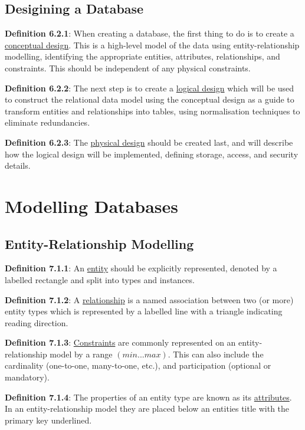 \documentclass{article}
\newcommand{\separate}[1] {\vspace{#1 pt}\noindent}
\newcommand{\definition}[2]{\textbf{Definition #1}: #2\label{def:#1}}
\begin{document}
\subsection{Desigining a Database}

\definition{6.2.1}{When creating a database, the first thing to do is to create a \underline{conceptual design}. This is a high-level model of the data using entity-relationship modelling, identifying the appropriate entities, attributes, relationships, and constraints. This should be independent of any physical constraints.}

\separate{5}\definition{6.2.2}{The next step is to create a \underline{logical design} which will be used to construct the relational data model using the conceptual design as a guide to transform entities and relationships into tables, using normalisation techniques to eliminate redundancies.}

\separate{5}\definition{6.2.3}{The \underline{physical design} should be created last, and will describe how the logical design will be implemented, defining storage, access, and security details.}

\newpage\section{Modelling Databases}

\subsection{Entity-Relationship Modelling}

\definition{7.1.1}{An \underline{entity} should be explicitly represented, denoted by a labelled rectangle and split into types and instances.}

\separate{5}\definition{7.1.2}{A \underline{relationship} is a named association between two (or more) entity types which is represented by a labelled line with a triangle indicating reading direction.}

\separate{5}\definition{7.1.3}{\underline{Constraints} are commonly represented on an entity-relationship model by a range \((min...max)\). This can also include the cardinality (one-to-one, many-to-one, etc.), and participation (optional or mandatory).}

\separate{5}\definition{7.1.4}{The properties of an entity type are known as its \underline{attributes}. In an entity-relationship model they are placed below an entities title with the primary key underlined.}
\end{document}
